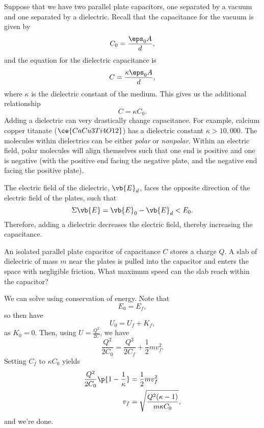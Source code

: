 \documentclass[11pt]{article}
\begin{document}
Suppose that we have two parallel plate capacitors, one separated by a vacuum and one separated by a dielectric. Recall that the capacitance for the vacuum is given by
\begin{equation}
    C_0 = \frac{\eps_0 A}{d},
\end{equation}
and the equation for the dielectric capacitance is
\begin{equation}
    C = \frac{\kappa \eps_0 A}{d},
\end{equation}
where $\kappa$ is the dielectric constant of the medium. This gives us the additional relationship
\begin{equation}
    C = \kappa C_0.
\end{equation}
Adding a dielectric can very drastically change capacitance. For example, calcium copper titanate ($\ce{CaCu3Ti4O12}$) has a dielectric constant $\kappa > 10,000$. The molecules within dielectrics can be either \textit{polar} or \textit{nonpolar}. Within an electric field, polar molecules will align themselves such that one end is positive and one is negative (with the positive end facing the negative plate, and the negative end facing the positive plate).

The electric field of the dielectric, $\vb{E}_d$, faces the opposite direction of the electric field of the plates, such that \[\Sigma \vb{E} = \vb{E}_0 - \vb{E}_d < E_0.\]
Therefore, adding a dielectric decreases the electric field, thereby increasing the capacitance.
\begin{example}
    An isolated parallel plate capacitor of capacitance $C$ stores a charge $Q$. A slab of dielectric of mass $m$ near the plates is pulled into the capacitor and enters the space with negligible friction. What maximum speed can the slab reach within the capacitor?
\end{example}
\begin{solution}
    We can solve using conservation of energy. Note that
    \[E_0 = E_f,\]
    so then have
    \[U_0 = U_f + K_f,\]
    as $K_0 = 0$. Then, using $U = \frac{Q^2}{2C}$, we have
    \begin{equation*}
        \frac{Q^2}{2C_0} = \frac{Q^2}{2C_f} + \frac{1}{2}mv_f^2.    
    \end{equation*}
    Setting $C_f$ to $\kappa C_0$ yields
    \begin{align*}
        \frac{Q^2}{2C_0}\p{1 - \frac{1}{\kappa}} &= \frac{1}{2}mv_f^2 \\
        v_f &= \sqrt{\frac{Q^2(\kappa -1)}{m\kappa C_0}},
    \end{align*}
    and we're done.
\end{solution}
\end{document}
